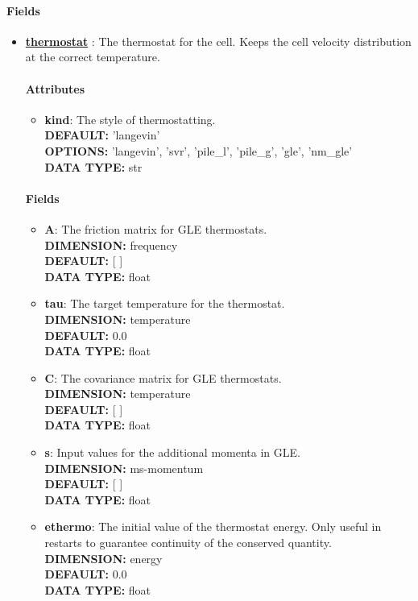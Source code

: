 \paragraph{Fields}
 \begin{itemize}
\item {\bf \hyperref[THERMOSTATS]{thermostat} }:
 The thermostat for the cell. Keeps the cell velocity distribution at the correct temperature.
\paragraph{Attributes}
 \begin{itemize}
\item {\bf kind}:
 The style of thermostatting.
{\\ \bf DEFAULT: }'langevin'
{\\ \bf OPTIONS: }'langevin', 'svr', 'pile\_l', 'pile\_g', 'gle', 'nm\_gle'
{\\ \bf DATA TYPE: }str
\end{itemize}
 
\paragraph{Fields}
 \begin{itemize}
\item {\bf A}:
 The friction matrix for GLE thermostats.
{\\ \bf DIMENSION: }frequency
{\\ \bf DEFAULT: }[ ]
{\\ \bf DATA TYPE: }float
\item {\bf tau}:
 The target temperature for the thermostat.
{\\ \bf DIMENSION: }temperature
{\\ \bf DEFAULT: }0.0
{\\ \bf DATA TYPE: }float
\item {\bf C}:
 The covariance matrix for GLE thermostats.
{\\ \bf DIMENSION: }temperature
{\\ \bf DEFAULT: }[ ]
{\\ \bf DATA TYPE: }float
\item {\bf s}:
 Input values for the additional momenta in GLE.
{\\ \bf DIMENSION: }ms-momentum
{\\ \bf DEFAULT: }[ ]
{\\ \bf DATA TYPE: }float
\item {\bf ethermo}:
 The initial value of the thermostat energy. Only useful in restarts to guarantee continuity of the conserved quantity. 
{\\ \bf DIMENSION: }energy
{\\ \bf DEFAULT: }0.0
{\\ \bf DATA TYPE: }float
\end{itemize}
 
\end{itemize}
 
